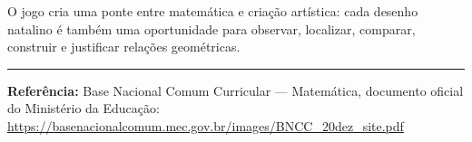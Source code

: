 \documentclass[11pt,a4paper]{article}
\begin{document}
O jogo cria uma ponte entre matemática e criação artística: cada desenho natalino é também uma oportunidade para observar, localizar, comparar, construir e justificar relações geométricas.

\vspace{1em}
\noindent\rule{\linewidth}{0.4pt}

\small\color{graytxt}
\textbf{Referência:} Base Nacional Comum Curricular --- Matemática, documento oficial do Ministério da Educação:\\
\url{https://basenacionalcomum.mec.gov.br/images/BNCC_20dez_site.pdf}
\end{document}

